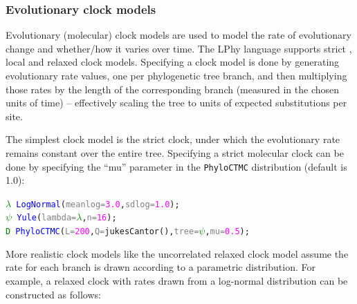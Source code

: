 \documentclass[10pt,letterpaper,table]{article}
\begin{document}
\subsubsection{Evolutionary clock models}
\label{sec:clockmodels}

Evolutionary (molecular) clock models are used to model the rate of evolutionary change and whether/how it varies over time. The LPhy language supports strict \cite{zuckerkandl1965evolutionary, zuckerkandl1965molecules}, local \cite{drummond2010bayesian} and relaxed clock \cite{drummond2006relaxedconfidence} models. 
Specifying a clock model is done by generating evolutionary rate values, one per phylogenetic tree branch, and then multiplying those rates by the length of the corresponding branch (measured in the chosen units of time) -- effectively scaling the tree to units of expected substitutions per site. 

The simplest clock model is the strict clock, under which the evolutionary rate remains constant over the entire tree. Specifying a strict molecular clock can be done by specifying the ``mu'' parameter in the \texttt{PhyloCTMC} distribution (default is 1.0):
{\small
\begin{alltt}
    \textcolor{green}{\(\lambda\)} ~ \textcolor{blue}{LogNormal}(\textcolor{gray}{meanlog=}\textcolor{magenta}{3.0}, \textcolor{gray}{sdlog=}\textcolor{magenta}{1.0});
    \textcolor{green}{\(\psi\)} ~ \textcolor{blue}{Yule}(\textcolor{gray}{lambda=}\textcolor{green}{\(\lambda\)}, \textcolor{gray}{n=}\textcolor{magenta}{16});
    \textcolor{green}{D} ~ \textcolor{blue}{PhyloCTMC}(\textcolor{gray}{L=}\textcolor{magenta}{200}, \textcolor{gray}{Q=}\textcolor{magenta!80!black}{jukesCantor}(), \textcolor{gray}{tree=}\textcolor{green}{\(\psi\)}, \textcolor{gray}{mu=}\textcolor{magenta}{0.5});
\end{alltt}
}
More realistic clock models like the uncorrelated relaxed clock model \cite{drummond2006relaxedconfidence} assume the rate for each branch is drawn according to a parametric distribution. For example, a relaxed clock with rates drawn from a log-normal distribution can be constructed as follows:
\end{document}
